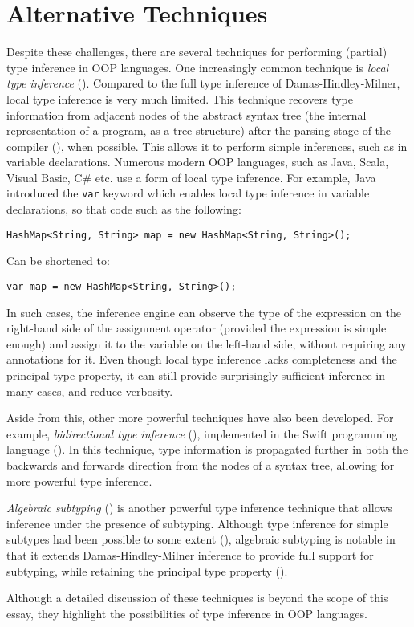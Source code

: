 \section{Alternative Techniques}

Despite these challenges, there are several techniques for performing (partial) type inference in OOP languages. One increasingly common technique is \textit{local type inference} (\cite{pierceturner}). Compared to the full type inference of Damas-Hindley-Milner, local type inference is very much limited. This technique recovers type information from adjacent nodes of the abstract syntax tree (the internal representation of a program, as a tree structure) after the parsing stage of the compiler (\cite{pierce}), when possible. This allows it to perform simple inferences, such as in variable declarations. Numerous modern OOP languages, such as Java, Scala, Visual Basic, C\# etc. use a form of local type inference. For example, Java introduced the \texttt{var} keyword which enables local type inference in variable declarations, so that code such as the following:
\begin{lstlisting}
HashMap<String, String> map = new HashMap<String, String>();
\end{lstlisting}
Can be shortened to:
\begin{lstlisting}
var map = new HashMap<String, String>();
\end{lstlisting}
In such cases, the inference engine can observe the type of the expression on the right-hand side of the assignment operator (provided the expression is simple enough) and assign it to the variable on the left-hand side, without requiring any annotations for it. Even though local type inference lacks completeness and the principal type property, it can still provide surprisingly sufficient inference in many cases, and reduce verbosity.

Aside from this, other more powerful techniques have also been developed. For example, \textit{bidirectional type inference} (\cite{pierceturner}), implemented in the Swift programming language (\cite{toni}). In this technique, type information is propagated further in both the backwards and forwards direction from the nodes of a syntax tree, allowing for more powerful type inference.

\textit{Algebraic subtyping} (\cite{dolan}) is another powerful type inference technique that allows inference under the presence of subtyping. Although type inference for simple subtypes had been possible to some extent (\cite{mitchell}), algebraic subtyping is notable in that it extends Damas-Hindley-Milner inference to provide full support for subtyping, while retaining the principal type property (\cite{parreaux}).

Although a detailed discussion of these techniques is beyond the scope of this essay, they highlight the possibilities of type inference in OOP languages.
